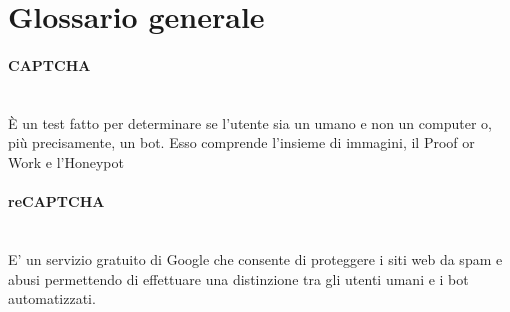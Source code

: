 \section{Glossario generale}

\paragraph{CAPTCHA}~\smallskip \\
È un test fatto per determinare se l'utente sia un umano e non un computer o, più precisamente, un bot.
Esso comprende l'insieme di immagini, il Proof or Work e l'Honeypot

\paragraph{reCAPTCHA}~\smallskip \\
E' un servizio gratuito di Google che consente di proteggere i siti web da spam e abusi permettendo di effettuare una distinzione tra gli utenti umani e i bot automatizzati.
